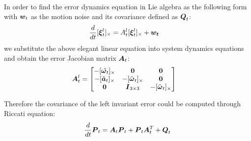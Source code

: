 In order to find the error dynamics equation in Lie algebra as the following form with $\boldsymbol{w}_t$ as the motion noise and its covariance defined as $\boldsymbol{Q}_t$:
\begin{align}
    & \frac{d}{dt}[\boldsymbol{\xi}^l_t]_{\times}  = A^l_t[\boldsymbol{\xi}^l_t]_{\times} + \boldsymbol{w_t}
\end{align}
we substitute the above elegant linear equation into system dynamics equations and obtain the error Jacobian matrix $\boldsymbol{A}_t$:
\begin{align}
    & \boldsymbol{A}^l_t = 
    \begin{bmatrix}
    -[\hat{\boldsymbol{\omega}_t}]_\times & \boldsymbol{0} & \boldsymbol{0} \\
    -[\hat{\boldsymbol{a}}_t]_\times & -[\hat{\boldsymbol{\omega}}_t]_\times & \boldsymbol{0} \\
    \boldsymbol{0} & \boldsymbol{I}_{3 \times 3} & -[\hat{\boldsymbol{\omega}}_t]_\times \\
    \end{bmatrix} 
\end{align}

Therefore the covariance of the left invariant error could be computed through Riccati equation:
\begin{equation}
    \frac{d}{dt}\boldsymbol{P}_t=\boldsymbol{A}_t\boldsymbol{P}_t+\boldsymbol{P}_t\boldsymbol{A}_t^T+\boldsymbol{Q}_t
\end{equation}



